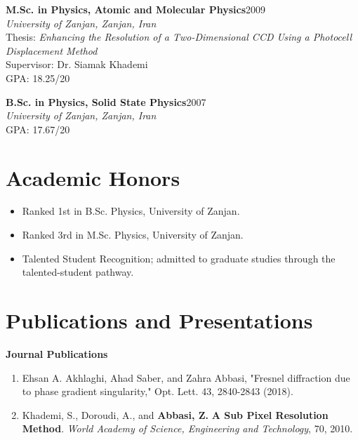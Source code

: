 \documentclass[11pt,a4paper]{article}
\newcommand{\entry}[4]{%
  \textbf{#1}\hfill {\color{light}#2}\\
  \textit{#3}\\[-1pt]
  #4\vspace{3pt}
}
\begin{document}
\entry{M.Sc. in Physics, Atomic and Molecular Physics}{2009}
{University of Zanjan, Zanjan, Iran}
{
Thesis: \textit{Enhancing the Resolution of a Two-Dimensional CCD Using a Photocell Displacement Method}\\
Supervisor: Dr. Siamak Khademi\\
GPA: 18.25/20
}

\entry{B.Sc. in Physics, Solid State Physics}{2007}
{University of Zanjan, Zanjan, Iran}
{
GPA: 17.67/20
}

\section*{Academic Honors}
\begin{itemize}
  \item Ranked 1st in B.Sc. Physics, University of Zanjan.
  \item Ranked 3rd in M.Sc. Physics, University of Zanjan.
  \item Talented Student Recognition; admitted to graduate studies through the talented-student pathway.
\end{itemize}

\section*{Publications and Presentations}

\textbf{Journal Publications}
\begin{enumerate}
  \item Ehsan A. Akhlaghi, Ahad Saber, and Zahra Abbasi, "Fresnel diffraction due to phase gradient singularity," Opt. Lett. 43, 2840-2843 (2018).
  \item Khademi, S., Doroudi, A., and \textbf{Abbasi, Z.} \textbf{A Sub Pixel Resolution Method}. \textit{World Academy of Science, Engineering and Technology}, 70, 2010.
\end{enumerate}
\end{document}
